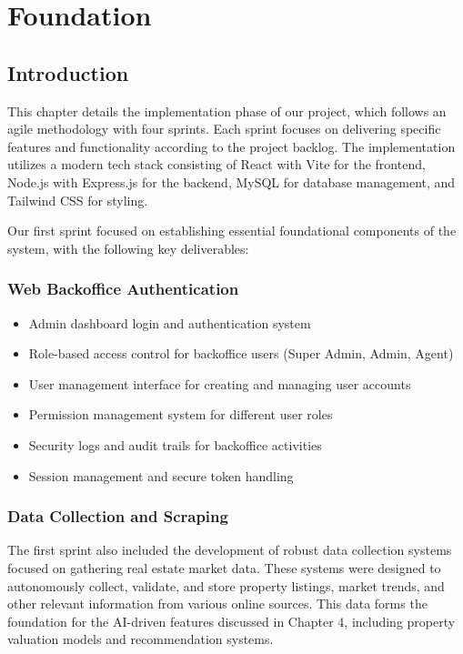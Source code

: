 \chapter{Foundation}

\section{Introduction}
This chapter details the implementation phase of our project, which follows an agile methodology with four sprints. Each sprint focuses on delivering specific features and functionality according to the project backlog. The implementation utilizes a modern tech stack consisting of React \cite{ReactWebsite} with Vite \cite{ViteJSWebsite} for the frontend, Node.js \cite{NodeJSWebsite} with Express.js \cite{ExpressJSWebsite} for the backend, MySQL \cite{MySQLWebsite} for database management, and Tailwind CSS \cite{TailwindWebsite} for styling.

Our first sprint focused on establishing essential foundational components of the system, with the following key deliverables:

\subsection{Web Backoffice Authentication}
\begin{itemize}
    \item Admin dashboard login and authentication system
    \item Role-based access control for backoffice users (Super Admin, Admin, Agent)
    \item User management interface for creating and managing user accounts
    \item Permission management system for different user roles
    \item Security logs and audit trails for backoffice activities
    \item Session management and secure token handling
\end{itemize}

\subsection{Data Collection and Scraping}
The first sprint also included the development of robust data collection systems focused on gathering real estate market data. These systems were designed to autonomously collect, validate, and store property listings, market trends, and other relevant information from various online sources. This data forms the foundation for the AI-driven features discussed in Chapter 4, including property valuation models and recommendation systems.

